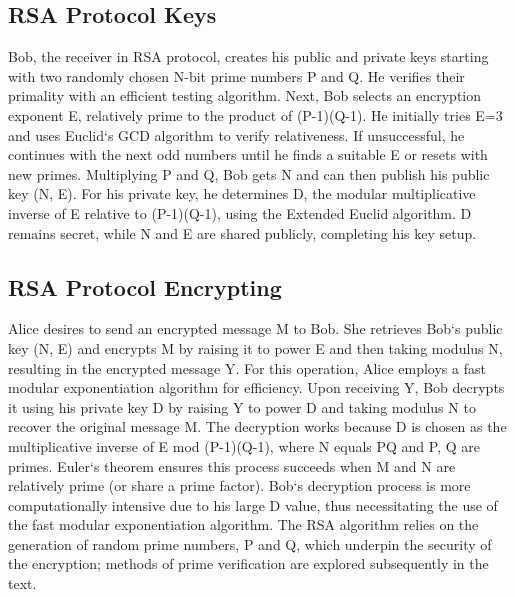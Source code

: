 \subsection*{RSA Protocol  Keys}
Bob, the receiver in RSA protocol, creates his public and private keys starting with two randomly chosen N-bit prime numbers P and Q\@.
He verifies their primality with an efficient testing algorithm.
Next, Bob selects an encryption exponent E, relatively prime to the product of (P-1)(Q-1).
He initially tries E=3 and uses Euclid`s GCD algorithm to verify relativeness.
If unsuccessful, he continues with the next odd numbers until he finds a suitable E or resets with new primes.
Multiplying P and Q, Bob gets N and can then publish his public key (N, E).
For his private key, he determines D, the modular multiplicative inverse of E relative to (P-1)(Q-1), using the Extended Euclid algorithm.
D remains secret, while N and E are shared publicly, completing his key setup.

\subsection*{RSA Protocol  Encrypting}
Alice desires to send an encrypted message M to Bob.
She retrieves Bob`s public key (N, E) and encrypts M by raising it to power E and then taking modulus N, resulting in the encrypted message Y\@.
For this operation, Alice employs a fast modular exponentiation algorithm for efficiency.
Upon receiving Y, Bob decrypts it using his private key D by raising Y to power D and taking modulus N to recover the original message M\@.
The decryption works because D is chosen as the multiplicative inverse of E mod (P-1)(Q-1), where N equals PQ and P, Q are primes.
Euler`s theorem ensures this process succeeds when M and N are relatively prime (or share a prime factor).
Bob`s decryption process is more computationally intensive due to his large D value, thus necessitating the use of the fast modular exponentiation algorithm.
The RSA algorithm relies on the generation of random prime numbers, P and Q, which underpin the security of the encryption; methods of prime verification are explored subsequently in the text.

